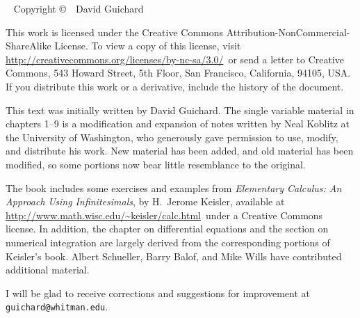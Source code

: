 \documentclass[justified,marginals=raggedouter]{tufte-book}
\newcounter{exercise}
\let\msk\medskip
\begin{document}
\begin{fullwidth}
~\vfill
\thispagestyle{empty}
\setlength{\parindent}{0pt}
\setlength{\parskip}{\baselineskip}
Copyright \copyright\ \the\year\ David Guichard

This work is licensed under the Creative Commons
Attribution-NonCommercial-ShareAlike License. To view a copy of this
license, visit 
\url{http://creativecommons.org/licenses/by-nc-sa/3.0/}~or
send a letter to Creative Commons, 543 Howard Street, 5th Floor, San
Francisco, California, 94105, USA. If you distribute this work or a
derivative, include the history of the document. 

\msk\noindent
This text was initially written by David Guichard. The single variable
material in chapters 1--9 is a modification and expansion of notes
written by Neal Koblitz at the University of Washington, who
generously gave permission to use, modify, and distribute his
work. New material has been added, and old material has been modified,
so some portions now bear little resemblance to the original.

\msk\noindent The book includes some exercises and examples from {\it
  Elementary Calculus: An Approach Using Infinitesimals}, by H.~Jerome
Keisler, available at
\url{http://www.math.wisc.edu/~keisler/calc.html}~under a Creative
Commons license. In addition, the chapter on differential equations
and the section on numerical integration are largely derived from the
corresponding portions of Keisler's book.  Albert Schueller, Barry
Balof, and Mike Wills have contributed additional material.


\msk\noindent
I will be glad to receive corrections and
suggestions for improvement at {\tt guichard@whitman.edu}. 

\end{fullwidth}

\tableofcontents

\listoffigures

\listoftables

\end{document}
